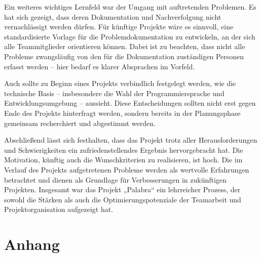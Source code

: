 \documentclass[12pt,a4paper]{article}
\begin{document}
Ein weiteres wichtiges Lernfeld war der Umgang mit auftretenden Problemen. Es hat sich gezeigt, dass deren Dokumentation und Nachverfolgung nicht vernachlässigt werden dürfen. Für künftige Projekte wäre es sinnvoll, eine standardisierte Vorlage für die Problemdokumentation zu entwickeln, an der sich alle Teammitglieder orientieren können. Dabei ist zu beachten, dass nicht alle Probleme zwangsläufig von den für die Dokumentation zuständigen Personen erfasst werden – hier bedarf es klarer Absprachen im Vorfeld.

Auch sollte zu Beginn eines Projekts verbindlich festgelegt werden, wie die technische Basis – insbesondere die Wahl der Programmiersprache und Entwicklungsumgebung – aussieht. Diese Entscheidungen sollten nicht erst gegen Ende des Projekts hinterfragt werden, sondern bereits in der Planungsphase gemeinsam recherchiert und abgestimmt werden.

Abschließend lässt sich festhalten, dass das Projekt trotz aller Herausforderungen und Schwierigkeiten ein zufriedenstellendes Ergebnis hervorgebracht hat. Die Motivation, künftig auch die Wunschkriterien zu realisieren, ist hoch. Die im Verlauf des Projekts aufgetretenen Probleme werden als wertvolle Erfahrungen betrachtet und dienen als Grundlage für Verbesserungen in zukünftigen Projekten. Insgesamt war das Projekt „Palabra“ ein lehrreicher Prozess, der sowohl die Stärken als auch die Optimierungspotenziale der Teamarbeit und Projektorganisation aufgezeigt hat.

\appendix
\section{Anhang}
\end{document}
